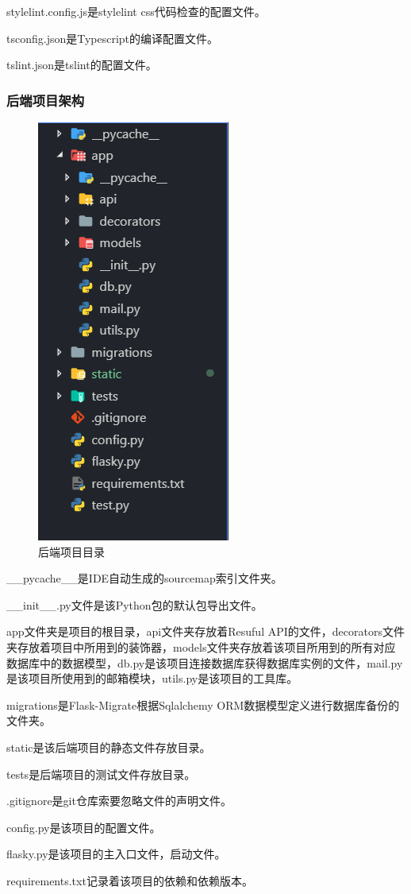 stylelint.config.js是stylelint css代码检查的配置文件。

tsconfig.json是Typescript的编译配置文件。

tslint.json是tslint的配置文件。

\subsubsection{后端项目架构}
\begin{figure}[thbp!]
	\centering
	\includegraphics[width=0.3\linewidth]{figure/backend_structure}
	\caption{后端项目目录}
	\label{fig:backend_structure}
\end{figure}

\_\_pycache\_\_是IDE自动生成的sourcemap索引文件夹。

\_\_init\_\_.py文件是该Python包的默认包导出文件。

app文件夹是项目的根目录，api文件夹存放着Resuful API的文件，decorators文件夹存放着项目中所用到的装饰器，models文件夹存放着该项目所用到的所有对应数据库中的数据模型，db.py是该项目连接数据库获得数据库实例的文件，mail.py是该项目所使用到的邮箱模块，utils.py是该项目的工具库。

migrations是Flask-Migrate根据Sqlalchemy ORM数据模型定义进行数据库备份的文件夹。

static是该后端项目的静态文件存放目录。

tests是后端项目的测试文件存放目录。

.gitignore是git仓库索要忽略文件的声明文件。

config.py是该项目的配置文件。

flasky.py是该项目的主入口文件，启动文件。

requirements.txt记录着该项目的依赖和依赖版本。

